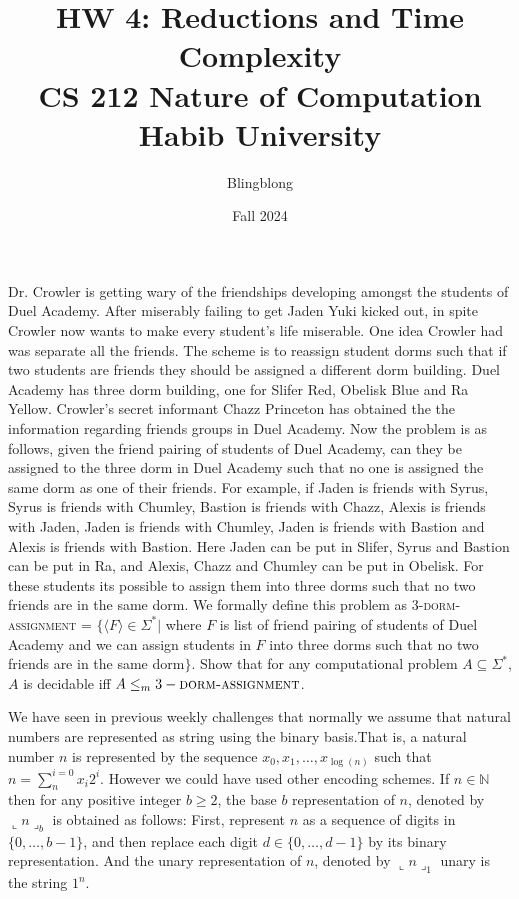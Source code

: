 \documentclass[addpoints]{exam}
\title{HW 4: Reductions and Time Complexity\\ \vspace{0.5cm} \Large CS 212 Nature of Computation\\Habib University}
\author{Blingblong} %
\date{Fall 2024}
\begin{document}
\maketitle

\begin{questions}

    \question[30] Dr. Crowler is getting wary of the friendships developing amongst the students of Duel Academy. After miserably failing to get Jaden Yuki kicked out, in spite Crowler now wants to make every student's life miserable. One idea Crowler had was separate all the friends. The scheme is to reassign student dorms such that if two students are friends they should be assigned a different dorm building. Duel Academy has three dorm building, one for Slifer Red, Obelisk Blue and Ra Yellow. Crowler's secret informant Chazz Princeton has obtained the the information regarding friends groups in Duel Academy. Now the problem is as follows, given the friend pairing of students of Duel Academy, can they be assigned to the three dorm in Duel Academy such that no one is assigned the same dorm as one of their friends. 
    For example, if Jaden is friends with Syrus, Syrus is friends with Chumley, Bastion is friends with Chazz, Alexis is friends with Jaden, Jaden is friends with Chumley, Jaden is friends with Bastion and Alexis is friends with Bastion. Here Jaden can be put in Slifer, Syrus and Bastion can be put in Ra, and Alexis, Chazz and Chumley can be put in Obelisk. For these students its possible to assign them into three dorms such that no two friends are in the same dorm. 
    We formally define this problem as 3-\textsc{dorm-assignment} = $\{\langle F \rangle \in \Sigma^*|$ where $F$ is list of friend pairing of students of Duel Academy and we can assign students in $F$ into three dorms such that no two friends are in the same dorm$\}$.
    Show that for any computational problem $A \subseteq \Sigma^*$, $A$ is decidable iff $A \leq_m 3-\textsc{dorm-assignment}$.
    \begin{solution}
    \end{solution}
    
    \question We have seen in previous weekly challenges that normally we assume that natural numbers are represented as string using the binary basis.That is, a natural number $n$ is represented by the sequence $x_0, x_1, \dots, x_{\log(n)}$ such that $n=\sum_{n}^{i=0}x_i 2^i$. However we could have used other encoding schemes. If $n\in \mathbb{N}$ then for any positive integer $b\geq 2$, the base $b$ representation of $n$, denoted by $\llcorner n \lrcorner_b$ is obtained as follows: First, represent $n$ as a sequence of digits in $\{0,\dots, b-1\}$, and then replace each digit $d \in \{0, \dots, d - 1\}$ by its binary representation. And the unary representation of $n$, denoted by $\llcorner n \lrcorner_1$ unary is the string $1^n$. 
    \begin{parts}

\end{parts}
\end{questions}
\end{document}
